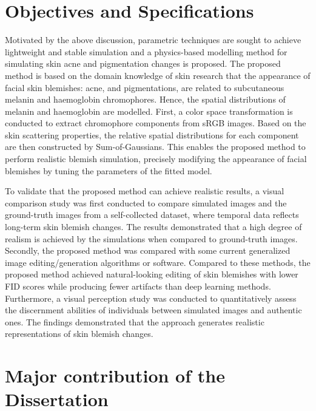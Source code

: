 \begin{spacing}{1.5}
\section{Objectives and Specifications}

Motivated by the above discussion, parametric techniques are sought to achieve lightweight and stable simulation and a physics-based modelling method for simulating skin acne and pigmentation changes is proposed. The proposed method is based on the domain knowledge of skin research that the appearance of facial skin blemishes: acne, and pigmentations, are related to subcutaneous melanin and haemoglobin chromophores. Hence, the spatial distributions of melanin and haemoglobin are modelled. First, a color space transformation is conducted to extract chromophore components from sRGB images. Based on the skin scattering properties, the relative spatial distributions for each component are then constructed by Sum-of-Gaussians. This enables the proposed method to perform realistic blemish simulation, precisely modifying the appearance of facial blemishes by tuning the parameters of the fitted model.

To validate that the proposed method can achieve realistic results, a visual comparison study was first conducted to compare simulated images and the ground-truth images from a self-collected dataset, where temporal data reflects long-term skin blemish changes. The results demonstrated that a high degree of realism is achieved by the simulations when compared to ground-truth images. Secondly, the proposed method was compared with some current generalized image editing/generation algorithms or software. Compared to these methods, the proposed method achieved natural-looking editing of skin blemishes with lower FID scores while producing fewer artifacts than deep learning methods. Furthermore, a visual perception study was conducted to quantitatively assess the discernment abilities of individuals between simulated images and authentic ones. The findings demonstrated that the approach generates realistic representations of skin blemish changes.


\section{Major contribution of the Dissertation}


\end{spacing}
